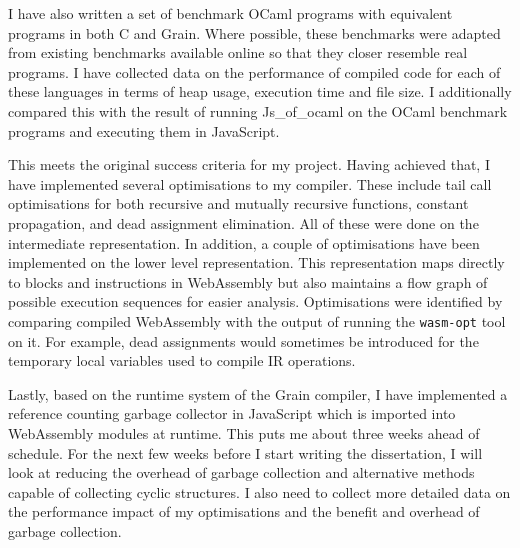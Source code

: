 \documentclass[a4paper,12pt,twoside]{report} %
\begin{document}
I have also written a set of benchmark OCaml programs with equivalent programs in both C and Grain.
Where possible, these benchmarks were adapted from existing benchmarks available online so that they closer resemble real programs.
I have collected data on the performance of compiled code for each of these languages in terms of heap usage, execution time and file size. I additionally compared this with the result of running Js\_of\_ocaml on the OCaml benchmark programs and executing them in JavaScript.


This meets the original success criteria for my project. Having achieved that, I have implemented several optimisations to my compiler. These include tail call optimisations for both recursive and mutually recursive functions, constant propagation, and dead assignment elimination. All of these were done on the intermediate representation. In addition, a couple of optimisations have been implemented on the lower level representation. This representation maps directly to blocks and instructions in WebAssembly but also maintains a flow graph of possible execution sequences for easier analysis. Optimisations were identified by comparing compiled WebAssembly with the output of running the \verb|wasm-opt| tool on it. For example, dead assignments would sometimes be introduced for the temporary local variables used to compile IR operations.


Lastly, based on the runtime system of the Grain compiler, I have implemented a reference counting garbage collector in JavaScript which is imported into WebAssembly modules at runtime. This puts me about three weeks ahead of schedule. For the next few weeks before I start writing the dissertation, I will look at reducing the overhead of garbage collection and alternative methods capable of collecting cyclic structures. I also need to collect more detailed data on the performance impact of my optimisations and the benefit and overhead of garbage collection.

 
\end{document}
